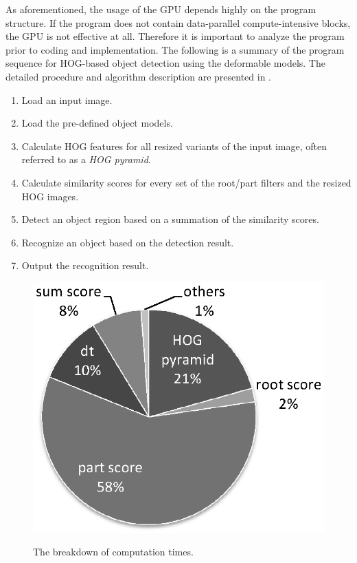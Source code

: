 As aforementioned, the usage of the GPU depends highly on the program
structure.
If the program does not contain data-parallel compute-intensive blocks,
the GPU is not effective at all.
Therefore it is important to analyze the program prior to coding and
implementation.
The following is a summary of the program sequence for HOG-based object
detection using the deformable models.
The detailed procedure and algorithm description are presented in
\cite{Felzenszwalb10, Niknejad12}.

\begin{enumerate}
\item Load an input image.
\item Load the pre-defined object models.
\item Calculate HOG features for all resized variants of the input
      image, often referred to as a \textit{HOG pyramid}.
\item Calculate similarity scores for every set of the root/part filters
      and the resized HOG images.
\item Detect an object region based on a summation of the similarity
      scores.
\item Recognize an object based on the detection result.
\item Output the recognition result.
\end{enumerate}

\begin{figure}[t]
 \begin{center}
  \includegraphics[width=0.5\hsize]{fig/breakdown.eps}\\
  \caption{The breakdown of computation times.}
  \label{fig:breakdown}
 \end{center}
\end{figure}

